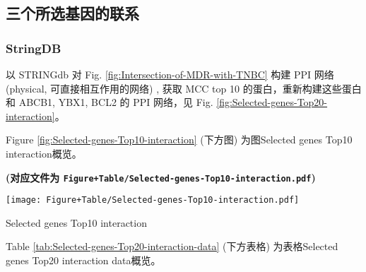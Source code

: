 \documentclass[
]{article}
\begin{document}
\begin{center}\vspace{1.5cm}\end{center}

\hypertarget{others}{%
\subsection{三个所选基因的联系}\label{others}}

\hypertarget{stringdb}{%
\subsubsection{StringDB}\label{stringdb}}

以 STRINGdb 对 Fig. \ref{fig:Intersection-of-MDR-with-TNBC} 构建 PPI 网络 (physical, 可直接相互作用的网络) ,
获取 MCC top 10 的蛋白，重新构建这些蛋白和 ABCB1, YBX1, BCL2 的 PPI 网络，见
Fig. \ref{fig:Selected-genes-Top20-interaction}。

\begin{center}\vspace{1.5cm}\end{center}

Figure \ref{fig:Selected-genes-Top10-interaction} (下方图) 为图Selected genes Top10 interaction概览。

\textbf{(对应文件为 \texttt{Figure+Table/Selected-genes-Top10-interaction.pdf})}

\def\@captype{figure}
\begin{center}
\texttt{[image: Figure+Table/Selected-genes-Top10-interaction.pdf]}
\caption{Selected genes Top10 interaction}\label{fig:Selected-genes-Top10-interaction}
\end{center}

\begin{center}\vspace{1.5cm}\end{center}

\begin{center}\vspace{1.5cm}\end{center}

Table \ref{tab:Selected-genes-Top20-interaction-data} (下方表格) 为表格Selected genes Top20 interaction data概览。
\end{document}
